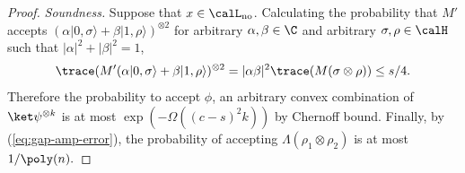 \begin{proof}
\emph{Soundness.} Suppose that $x\in\calL_{\mathrm{no}}$. 
Calculating the probability that $M'$ accepts $(\alpha|0,\sigma\rangle+\beta|1,\rho\rangle)^{\otimes 2}$ for arbitrary $\alpha,\beta \in \C$ and arbitrary $\sigma, \rho\in \calH$ such that $|\alpha|^2+|\beta|^2=1$,
\[
    \trace( M' (\alpha|0,\sigma\rangle+\beta|1,\rho\rangle)^{\otimes 2}
     =|\alpha\beta|^2\trace( M (\sigma\otimes \rho))\le s/4.
\]
Therefore the probability to accept $\phi$, an arbitrary convex combination of $\ket\psi^{\otimes k}$ is at most $\exp(-\Omega((c-s)^2 k))$ by Chernoff bound. Finally, by (\ref{eq:gap-amp-error}), the probability of accepting $\Lambda(\rho_1\otimes\rho_2)$ is at most $1/\poly(n).$
\end{proof}

